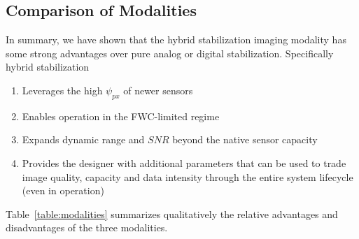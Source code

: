 \documentclass[]{spieman}  %
\begin{document}


\subsection{Comparison of Modalities}
In summary, we have shown that the hybrid stabilization imaging modality has some strong advantages over pure analog or digital stabilization.  Specifically hybrid stabilization

\begin{enumerate}
\item Leverages the high $\psi_{px}$ of newer sensors 
\item Enables operation in the FWC-limited regime 
\item Expands dynamic range and $SNR$ beyond the native sensor capacity 
\item Provides the designer with additional parameters that can be used to trade image quality, capacity and data intensity through the entire system lifecycle (even in operation)
\end{enumerate}

Table~\ref{table:modalities} summarizes qualitatively the relative advantages and disadvantages of the three modalities.
\end{document}
